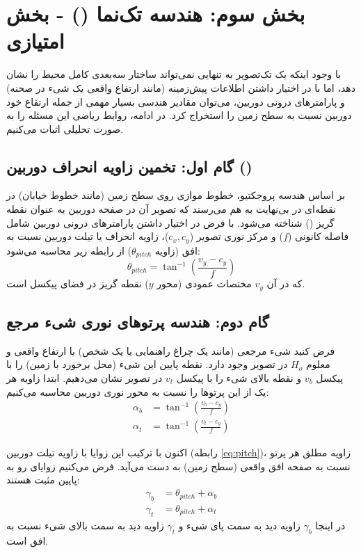 \documentclass[12pt,a4paper]{article}
\begin{document}
\section{بخش سوم: هندسه تک‌نما () - بخش امتیازی}
با وجود اینکه یک تک‌تصویر به تنهایی نمی‌تواند ساختار سه‌بعدی کامل محیط را نشان دهد، اما با در اختیار داشتن اطلاعات پیش‌زمینه (مانند ارتفاع واقعی یک شیء در صحنه) و پارامترهای درونی دوربین، می‌توان مقادیر هندسی بسیار مهمی از جمله ارتفاع خود دوربین نسبت به سطح زمین را استخراج کرد. در ادامه، روابط ریاضی این مسئله را به صورت تحلیلی اثبات می‌کنیم.

\subsection{گام اول: تخمین زاویه انحراف دوربین ()}
بر اساس هندسه پروجکتیو، خطوط موازی روی سطح زمین (مانند خطوط خیابان) در نقطه‌ای در بی‌نهایت به هم می‌رسند که تصویر آن در صفحه دوربین به عنوان نقطه گریز () شناخته می‌شود. با فرض در اختیار داشتن پارامترهای درونی دوربین شامل فاصله کانونی ($f$) و مرکز نوری تصویر ($c_x, c_y$)، زاویه انحراف یا تیلت دوربین نسبت به افق (زاویه $\theta_{pitch}$) از رابطه زیر محاسبه می‌شود:
\begin{equation}
	\label{eq:pitch}
	\theta_{pitch} = \tan^{-1}\left(\frac{v_y - c_y}{f}\right)
\end{equation}
که در آن $v_y$ مختصات عمودی (محور $y$) نقطه گریز در فضای پیکسل است.

\subsection{گام دوم: هندسه پرتوهای نوری شیء مرجع}
فرض کنید شیء مرجعی (مانند یک چراغ راهنمایی یا یک شخص) با ارتفاع واقعی و معلوم $H_o$ در تصویر وجود دارد. نقطه پایین این شیء (محل برخورد با زمین) را با پیکسل $v_b$ و نقطه بالای شیء را با پیکسل $v_t$ در تصویر نشان می‌دهیم.
ابتدا زاویه هر یک از این پرتوها را نسبت به محور نوری  دوربین محاسبه می‌کنیم:
\begin{align}
	\alpha_b &= \tan^{-1}\left(\frac{v_b - c_y}{f}\right) \\
	\alpha_t &= \tan^{-1}\left(\frac{v_t - c_y}{f}\right)
\end{align}

اکنون با ترکیب این زوایا با زاویه تیلت دوربین (رابطه \ref{eq:pitch})، زاویه مطلق هر پرتو نسبت به صفحه افق واقعی (سطح زمین) به دست می‌آید. فرض می‌کنیم زوایای رو به پایین مثبت هستند:
\begin{align}
	\gamma_b &= \theta_{pitch} + \alpha_b \label{eq:gamma_b} \\
	\gamma_t &= \theta_{pitch} + \alpha_t \label{eq:gamma_t}
\end{align}
در اینجا $\gamma_b$ زاویه دید به سمت پای شیء و $\gamma_t$ زاویه دید به سمت بالای شیء نسبت به افق است.
\end{document}
